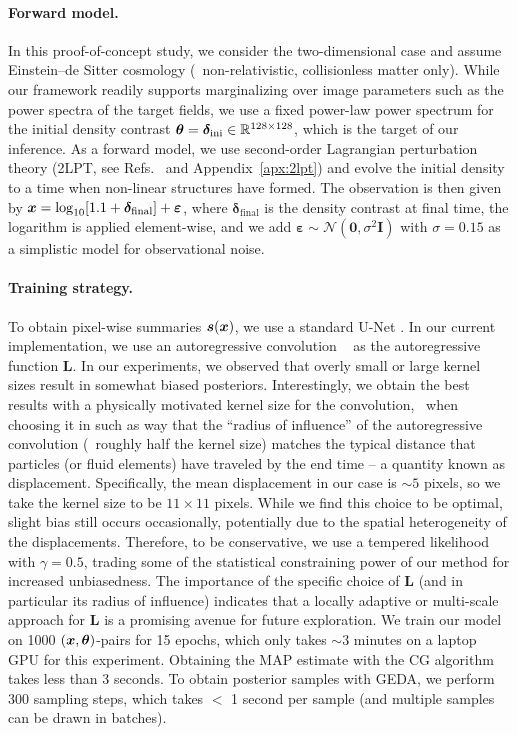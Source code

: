 \paragraph{Forward model.} In this proof-of-concept study, we consider the two-dimensional case and assume Einstein--de Sitter cosmology (\ie\ non-relativistic, collisionless matter only). While our framework readily supports marginalizing over image parameters such as the power spectra of the target fields, we use a fixed power-law power spectrum for the initial density contrast $\bm{\theta} = \bm \delta_{\mathrm{ini}} \in \mathbb{R}^{128 \times 128}$, which is the target of our inference.
As a forward model, we use second-order Lagrangian perturbation theory (2LPT, see Refs.~\cite{Bouchet:1992aa, Buchert:1993aa} and Appendix~\ref{apx:2lpt}) and evolve the initial density to a time when non-linear structures have formed. The observation is then given by $\bm{x} = \log_{10}[1.1 + {\bm \delta}_{\mathrm{final}}] + \bm \varepsilon$, where ${\bm \delta}_{\mathrm{final}}$ is the density contrast at final time, the logarithm is applied element-wise, and we add $\bm \varepsilon \sim \mathcal{N}(\bm 0, \sigma^2 \bm I)$ with $\sigma = 0.15$ as a simplistic model for observational noise.

\paragraph{Training strategy.}To obtain pixel-wise summaries $\bm{s}(\bm{x})$, we use a standard U-Net \cite{ronneberger:2015u}. In our current implementation, we use an autoregressive convolution ~\cite[\eg,][]{van:2016pixel} as the autoregressive function $\bm L$. In our experiments, we observed that overly small or large kernel sizes result in somewhat biased posteriors. Interestingly, we obtain the best results with a physically motivated kernel size for the convolution, \ie\ when choosing it in such as way that the ``radius of influence'' of the autoregressive convolution (\ie\ roughly half the kernel size) matches the typical distance that particles (or fluid elements)
have traveled by the end time -- a quantity known as displacement. Specifically, the mean displacement in our case is $\sim 5$ pixels, so we take the kernel size to be $11 \times 11$ pixels. While we find this choice to be optimal, slight bias still occurs occasionally, potentially due to the spatial heterogeneity of the displacements. Therefore, to be conservative, we use a tempered likelihood with $\gamma = 0.5$, trading some of the statistical constraining power of our method for increased unbiasedness. The importance of the specific choice of $\bm L$ (and in particular its radius of influence) indicates that a locally adaptive or multi-scale approach for $\bm L$ is a promising avenue for future exploration. We train our model on 1000 $(\bm{x}, \bm{\theta})$-pairs for 15 epochs, which only takes $\sim 3$ minutes on a laptop GPU for this experiment. Obtaining the MAP estimate with the CG algorithm takes less than 3 seconds. To obtain posterior samples with GEDA, we perform 300 sampling steps, which takes $<$ 1 second per sample (and multiple samples can be drawn in batches).

